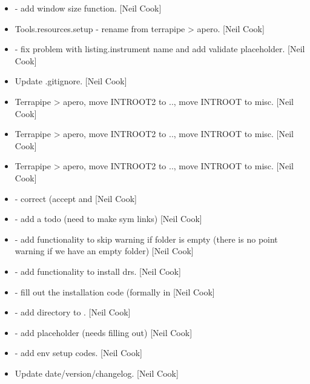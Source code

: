 \documentclass[a4paper,10pt,english]{report}
\begin{document}
\begin{itemize}
\item {} 
 - add window size function. {[}Neil
Cook{]}

\item {} 
Tools.resources.setup - rename from terrapipe \textendash{}\textgreater{} apero. {[}Neil Cook{]}

\item {} 
 - fix problem with
listing.instrument name and add validate placeholder. {[}Neil Cook{]}

\item {} 
Update .gitignore. {[}Neil Cook{]}

\item {} 
Terrapipe \textendash{}\textgreater{} apero, move INTROOT2 to .., move INTROOT to misc. {[}Neil
Cook{]}

\item {} 
Terrapipe \textendash{}\textgreater{} apero, move INTROOT2 to .., move INTROOT to misc. {[}Neil
Cook{]}

\item {} 
Terrapipe \textendash{}\textgreater{} apero, move INTROOT2 to .., move INTROOT to misc. {[}Neil
Cook{]}

\item {} 
 - correct 
(accept  and  {[}Neil Cook{]}

\item {} 
 - add a todo (need to make sym links) {[}Neil Cook{]}

\item {} 
 - add functionality to skip warning if
folder is empty (there is no point warning if we have an empty folder)
{[}Neil Cook{]}

\item {} 
 - add functionality to install
drs. {[}Neil Cook{]}

\item {} 
 - fill out the installation code (formally in
 {[}Neil Cook{]}

\item {} 
 - add directory to . {[}Neil Cook{]}

\item {} 
 - add placeholder (needs filling out) {[}Neil
Cook{]}

\item {} 
 - add env setup codes. {[}Neil Cook{]}

\item {} 
Update date/version/changelog. {[}Neil Cook{]}

\end{itemize}
\end{document}
